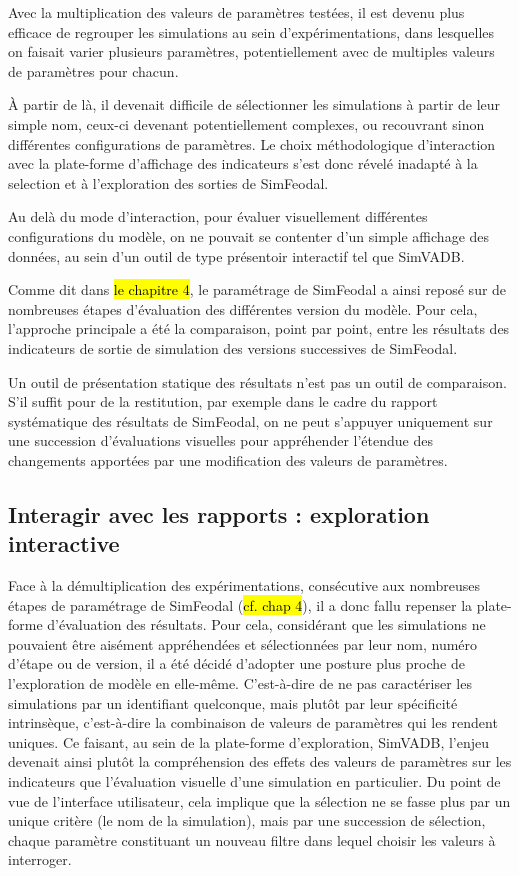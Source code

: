 	Avec la multiplication des valeurs de paramètres testées, il est devenu plus efficace de regrouper les simulations au sein d'expérimentations, dans lesquelles on faisait varier plusieurs paramètres, potentiellement avec de multiples valeurs de paramètres pour chacun.

	À partir de là, il devenait difficile de sélectionner les simulations à partir de leur simple nom, ceux-ci devenant potentiellement complexes, ou recouvrant sinon différentes configurations de paramètres.
	Le choix méthodologique d'interaction avec la plate-forme d'affichage des indicateurs s'est donc révelé inadapté à la selection et à l'exploration des sorties de SimFeodal.

	Au delà du mode d'interaction, pour évaluer visuellement différentes configurations du modèle, on ne pouvait se contenter d'un simple affichage des données, au sein d'un outil de type présentoir interactif tel que SimVADB.

	Comme dit dans \hl{le chapitre 4}, le paramétrage de SimFeodal a ainsi reposé sur de nombreuses étapes d'évaluation des différentes version du modèle.
	Pour cela, l'approche principale a été la comparaison, point par point, entre les résultats des indicateurs de sortie de simulation des versions successives de SimFeodal.

	Un outil de présentation statique des résultats n'est pas un outil de comparaison.
	S'il suffit pour de la restitution, par exemple dans le cadre du rapport systématique des résultats de SimFeodal, on ne peut s'appuyer uniquement sur une succession d'évaluations visuelles pour appréhender l'étendue des changements apportées par une modification des valeurs de paramètres.

	\subsection{Interagir avec les rapports : exploration interactive}

	Face à la démultiplication des expérimentations, consécutive aux nombreuses étapes de paramétrage de SimFeodal (\hl{cf. chap 4}), il a donc fallu repenser la plate-forme d'évaluation des résultats.
	Pour cela, considérant que les simulations ne pouvaient être aisément appréhendées et sélectionnées par leur nom, numéro d'étape ou de version, il a été décidé d'adopter une posture plus proche de l'exploration de modèle en elle-même.
	C'est-à-dire de ne pas caractériser les simulations par un identifiant quelconque, mais plutôt par leur spécificité intrinsèque, c'est-à-dire la combinaison de valeurs de paramètres qui les rendent uniques.
	Ce faisant, au sein de la plate-forme d'exploration, SimVADB, l'enjeu devenait ainsi plutôt la compréhension des effets des valeurs de paramètres sur les indicateurs que l'évaluation visuelle d'une simulation en particulier.
	Du point de vue de l'interface utilisateur, cela implique que la sélection ne se fasse plus par un unique critère (le nom de la simulation), mais par une succession de sélection, chaque paramètre constituant un nouveau filtre dans lequel choisir les valeurs à interroger.

